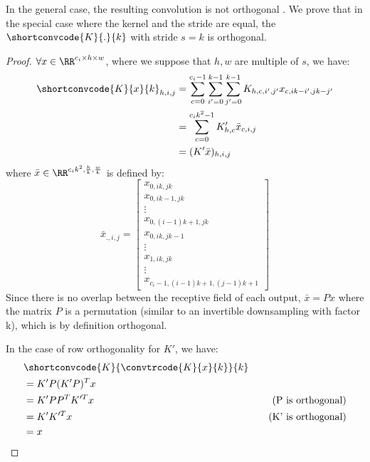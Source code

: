     In the general case, the resulting convolution is not orthogonal \cite{achour2023existencestabilityscalabilityorthogonal}. We prove that in the special case where the kernel and the stride are equal, the $\shortconvcode{K}{.}{k}$ with stride $s=k$  is orthogonal.

    
        \begin{proof}
        $\forall x\in\RR^{c_i\times h\times w}$, where we suppose that $h,w$ are multiple of $s$, we have:
        \begin{align*}
            \shortconvcode{K}{x}{k}_{h,i,j}            &= \sum_{c = 0}^{c_{i}-1} \sum_{i' = 0}^{k - 1} \sum_{j' = 0}^{k - 1} K_{h,c,i',j'}x_{c,ik-i',jk-j'} \\
            &=  \sum_{c = 0}^{c_{i}k^2-1} K'_{h,c}\bar{x}_{c,i,j} \\
            &= (K'\bar{x})_{h,i,j}
        \end{align*}
        where $\bar{x} \in\RR^{c_ik^2,\frac{h}{k},\frac{w}{k}}$ is defined by:
        \[
        \bar{x}_{.,i,j} = \begin{bmatrix}x_{0,ik,jk}\\x_{0,ik-1,jk}\\ \vdots \\ x_{0,(i-1)k+1,jk}\\ x_{0,ik,jk-1}\\ \vdots \\ x_{1,ik,jk}\\ \vdots \\ x_{c_i-1,(i-1)k+1,(j-1)k+1}\end{bmatrix} 
        \]
        Since there is no overlap between the receptive field of each output, $\bar{x}=Px$ where the matrix $P$ is a permutation (similar to an invertible downsampling with factor k), which is by definition orthogonal.

        In the case of row orthogonality for $K'$, we have:
\begin{align*}
    &\shortconvcode{K}{\convtrcode{K}{x}{k}}{k} \\
    &= K'P(K'P)^Tx \\
    &= K'PP^TK'^Tx  & \quad \text{(P is orthogonal)}\\ 
    &= K'K'^Tx & \quad \text{(K' is orthogonal)}\\
    &= x
\end{align*}

        \end{proof}

